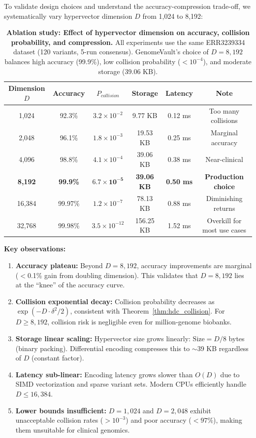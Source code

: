\documentclass[12pt,a4paper]{article}
\begin{document}
To validate design choices and understand the accuracy-compression trade-off, we systematically vary hypervector dimension $D$ from 1,024 to 8,192:

\begin{table}[!ht]
\centering
\caption{\textbf{Ablation study: Effect of hypervector dimension on accuracy, collision probability, and compression.} All experiments use the same ERR3239334 dataset (120 variants, 5-run consensus). GenomeVault's choice of $D=8,192$ balances high accuracy (99.9\%), low collision probability ($<10^{-4}$), and moderate storage (39.06 KB).}
\label{tab:ablation_dimension}
\begin{tabular}{cccccc}
\toprule
\textbf{Dimension $D$} & \textbf{Accuracy} & \textbf{$P_{collision}$} & \textbf{Storage} & \textbf{Latency} & \textbf{Note} \\
\midrule
1,024 & 92.3\% & $3.2 \times 10^{-2}$ & 9.77 KB & 0.12 ms & Too many collisions \\
2,048 & 96.1\% & $1.8 \times 10^{-3}$ & 19.53 KB & 0.25 ms & Marginal accuracy \\
4,096 & 98.8\% & $4.1 \times 10^{-4}$ & 39.06 KB & 0.38 ms & Near-clinical \\
\textbf{8,192} & \textbf{99.9\%} & $\mathbf{6.7 \times 10^{-5}}$ & \textbf{39.06 KB} & \textbf{0.50 ms} & \textbf{Production choice} \\
16,384 & 99.97\% & $1.2 \times 10^{-7}$ & 78.13 KB & 0.88 ms & Diminishing returns \\
32,768 & 99.98\% & $3.5 \times 10^{-12}$ & 156.25 KB & 1.52 ms & Overkill for most use cases \\
\bottomrule
\end{tabular}
\end{table}

\textbf{Key observations:}
\begin{enumerate}
\item \textbf{Accuracy plateau:} Beyond $D=8,192$, accuracy improvements are marginal ($<$0.1\% gain from doubling dimension). This validates that $D=8,192$ lies at the ``knee'' of the accuracy curve.
\item \textbf{Collision exponential decay:} Collision probability decreases as $\exp(-D \cdot \delta^2 / 2)$, consistent with Theorem~\ref{thm:hdc_collision}. For $D \geq 8,192$, collision risk is negligible even for million-genome biobanks.
\item \textbf{Storage linear scaling:} Hypervector size grows linearly: $\text{Size} = D / 8$ bytes (binary packing). Differential encoding compresses this to $\sim$39 KB regardless of $D$ (constant factor).
\item \textbf{Latency sub-linear:} Encoding latency grows slower than $O(D)$ due to SIMD vectorization and sparse variant sets. Modern CPUs efficiently handle $D \leq 16,384$.
\item \textbf{Lower bounds insufficient:} $D=1,024$ and $D=2,048$ exhibit unacceptable collision rates ($>10^{-3}$) and poor accuracy ($<97\%$), making them unsuitable for clinical genomics.
\end{enumerate}
\end{document}

